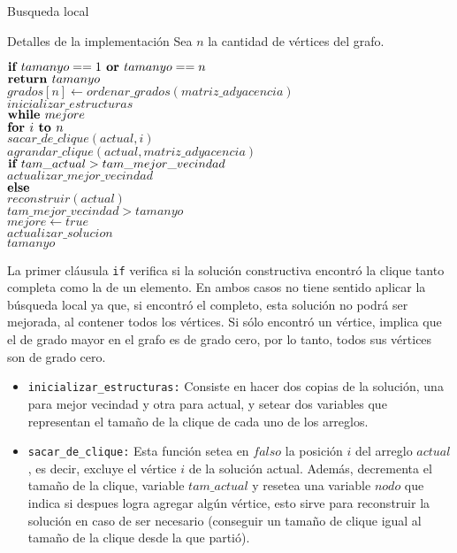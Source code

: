 \begin{section}{Busqueda local}
\begin{subsection}{Detalles de la implementación}
			Sea $n$ la cantidad de vértices del grafo.

			\begin{pseudo}
				\tab $\textbf{if } tamanyo==1 \textbf{ or } tamanyo==n$\\
				\tab \tab $\textbf{return } tamanyo$\\
				\tab $grados[n] \leftarrow ordenar\_grados(matriz\_adyacencia)$\\
				\tab $inicializar\_estructuras$\\
				\tab $\textbf{while } mejore$\\
				\tab \tab $\textbf{for } i \textbf{ to } n$\\
				\tab \tab \tab $sacar\_de\_clique(actual,i)$\\
				\tab \tab \tab $agrandar\_clique(actual,matriz\_adyacencia)$\\
				\tab \tab \tab$\textbf{if } tam\_actual>tam\_mejor\_vecindad$\\
				\tab \tab \tab \tab $actualizar\_mejor\_vecindad$\\
				\tab \tab \tab$\textbf{else }$\\
				\tab \tab \tab \tab $reconstruir(actual)$\\
				\tab \tab \IF $tam\_mejor\_vecindad>tamanyo$\\
				\tab \tab \tab $mejore 	\leftarrow true$\\
				\tab \tab \tab $actualizar\_solucion$\\
				\tab \RET $tamanyo$\\
			\end{pseudo}

		La primer cláusula \texttt{if} verifica si la solución constructiva encontró la clique tanto completa como la de un elemento. En ambos casos no tiene sentido aplicar la búsqueda local ya que, si encontró el completo, esta solución no podrá ser mejorada, al contener todos los vértices. Si sólo encontró un vértice, implica que el de grado mayor en el grafo es de grado cero, por lo tanto, todos sus vértices son de grado cero. 

		\begin{itemize}
			\item \texttt{inicializar\_estructuras:} Consiste en hacer dos copias de la solución, una para mejor vecindad y otra para actual, y setear dos variables que representan el tamaño de la clique de cada uno de los arreglos.
		
			\item \texttt{sacar\_de\_clique:} Esta función setea en $falso$ la posición $i$ del arreglo $actual$, es decir, excluye el vértice $i$ de la solución actual. Además, decrementa el tamaño de la clique, variable $tam\_actual$ y resetea una variable $nodo$ que indica si despues logra agregar algún vértice, esto sirve para reconstruir la solución en caso de ser necesario (conseguir un tamaño de clique igual al tamaño de la clique desde la que partió).


\end{itemize}
\end{subsection}
\end{section}
